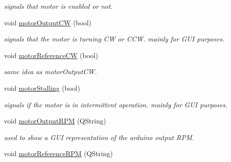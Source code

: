 \begin{DoxyCompactItemize}
\begin{DoxyCompactList}\small\item\em signals that motor is enabled or not. \end{DoxyCompactList}\item 
\hypertarget{class_main_window_a4ae4250857ad51ba9ee370c7cb5aba10}{void \hyperlink{class_main_window_a4ae4250857ad51ba9ee370c7cb5aba10}{motor\+Output\+C\+W} (bool)}\label{class_main_window_a4ae4250857ad51ba9ee370c7cb5aba10}

\begin{DoxyCompactList}\small\item\em signals that the motor is turning C\+W or C\+C\+W. mainly for G\+U\+I purposes. \end{DoxyCompactList}\item 
void \hyperlink{class_main_window_aa6ffd0e450f99c7c5a7e6f3c0cbc426d}{motor\+Reference\+C\+W} (bool)
\begin{DoxyCompactList}\small\item\em same idea as motor\+Output\+C\+W. \end{DoxyCompactList}\item 
\hypertarget{class_main_window_a56fcae02f5626144c7fd8c84cebcf616}{void \hyperlink{class_main_window_a56fcae02f5626144c7fd8c84cebcf616}{motor\+Stalling} (bool)}\label{class_main_window_a56fcae02f5626144c7fd8c84cebcf616}

\begin{DoxyCompactList}\small\item\em signals if the motor is in intermittent operation. mainly for G\+U\+I purposes. \end{DoxyCompactList}\item 
\hypertarget{class_main_window_aa452712ecfff8368afbb85d733d0c462}{void \hyperlink{class_main_window_aa452712ecfff8368afbb85d733d0c462}{motor\+Output\+R\+P\+M} (Q\+String)}\label{class_main_window_aa452712ecfff8368afbb85d733d0c462}

\begin{DoxyCompactList}\small\item\em used to show a G\+U\+I representation of the arduino output R\+P\+M. \end{DoxyCompactList}\item 
\hypertarget{class_main_window_a95fb9d48208417324b0e1cb6a1f046c8}{void \hyperlink{class_main_window_a95fb9d48208417324b0e1cb6a1f046c8}{motor\+Reference\+R\+P\+M} (Q\+String)}\label{class_main_window_a95fb9d48208417324b0e1cb6a1f046c8}


\end{DoxyCompactItemize}
